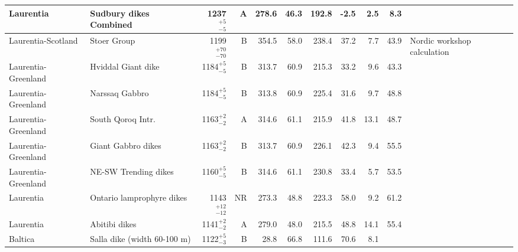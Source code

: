 \begin{ThreePartTable}
\begin{longtable}{p{1.4 in}p{1.2 in}rrrrrrrrp{1.2 in}}
                     Laurentia &                             Sudbury dikes Combined &     1237$^{+5}_{-5}$ &      A &     278.6 &      46.3 & 192.8 &  -2.5 &       2.5 &         8.3 &                                 \cite{Palmer1977a} \\ \hline
            Laurentia-Scotland &                                        Stoer Group &   1199$^{+70}_{-70}$ &      B &     354.5 &      58.0 & 238.4 &  37.2 &       7.7 &        43.9 &                        Nordic workshop calculation \\ \hline
           Laurentia-Greenland &                                 Hviddal Giant dike &     1184$^{+5}_{-5}$ &      B &     313.7 &      60.9 & 215.3 &  33.2 &       9.6 &        43.3 &                                  \cite{Piper1977a} \\ \hline
           Laurentia-Greenland &                                     Narssaq Gabbro &     1184$^{+5}_{-5}$ &      B &     313.8 &      60.9 & 225.4 &  31.6 &       9.7 &        48.8 &                                  \cite{Piper1977a} \\ \hline
           Laurentia-Greenland &                                  South Qoroq Intr. &     1163$^{+2}_{-2}$ &      A &     314.6 &      61.1 & 215.9 &  41.8 &      13.1 &        48.7 &                                  \cite{Piper1992a} \\ \hline
           Laurentia-Greenland &                                 Giant Gabbro dikes &     1163$^{+2}_{-2}$ &      B &     313.7 &      60.9 & 226.1 &  42.3 &       9.4 &        55.5 &                                  \cite{Piper1977a} \\ \hline
           Laurentia-Greenland &                               NE-SW Trending dikes &     1160$^{+5}_{-5}$ &      B &     314.6 &      61.1 & 230.8 &  33.4 &       5.7 &        53.5 &                                  \cite{Piper1992a} \\ \hline
                     Laurentia &                          Ontario lamprophyre dikes &   1143$^{+12}_{-12}$ &     NR &     273.3 &      48.8 & 223.3 &  58.0 &       9.2 &        61.2 &                                 \cite{Piispa2018a} \\ \hline
                     Laurentia &                                      Abitibi dikes &     1141$^{+2}_{-2}$ &      A &     279.0 &      48.0 & 215.5 &  48.8 &      14.1 &        55.4 &                                  \cite{Ernst1993a} \\ \hline                       Baltica &                        Salla dike (width 60-100 m) &     1122$^{+5}_{-3}$ &      B &      28.8 &      66.8 & 111.6 &  70.6 &       8.1 &          &                                                 \\ \hline

\end{longtable}
\end{ThreePartTable}
